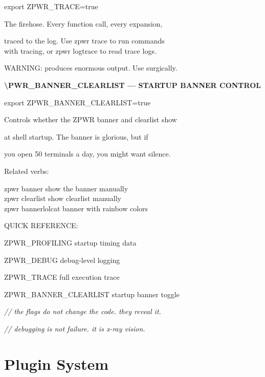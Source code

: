 \documentclass[11pt,a4paper,twoside]{book}
\begin{document}
export ZPWR\_TRACE=true

The firehose. Every function call, every expansion,

\begin{codebox}
traced to the log. Use zpwr trace to run commands\\
with tracing, or zpwr logtrace to read trace logs.\\
\end{codebox}

WARNING: produces enormous output. Use surgically.


\vspace{12pt}
{\bfseries\color{neonyellow} \textbackslash{}PWR\_BANNER\_CLEARLIST — STARTUP BANNER CONTROL}\vspace{4pt}

export ZPWR\_BANNER\_CLEARLIST=true

Controls whether the ZPWR banner and clearlist show

at shell startup. The banner is glorious, but if

you open 50 terminals a day, you might want silence.

Related verbs:

\begin{codebox}
zpwr banner          show the banner manually\\
zpwr clearlist       show clearlist manually\\
zpwr bannerlolcat    banner with rainbow colors\\
\end{codebox}

QUICK REFERENCE:

ZPWR\_PROFILING        startup timing data

ZPWR\_DEBUG            debug-level logging

ZPWR\_TRACE            full execution trace

ZPWR\_BANNER\_CLEARLIST startup banner toggle

{\small\itshape\color{dimtext} // the flags do not change the code. they reveal it.}

{\small\itshape\color{dimtext} // debugging is not failure. it is x-ray vision.}


\vspace{16pt}

\section{Plugin System}
\end{document}
